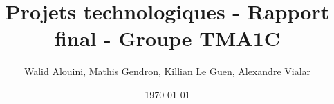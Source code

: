 \documentclass[12pt]{article}
\begin{document}
\title{Projets technologiques - Rapport final - Groupe TMA1C}
\author{Walid Alouini, Mathis Gendron, Killian Le Guen, Alexandre Vialar}
\date{\today}

\maketitle

\tableofcontents



%
\end{document}
